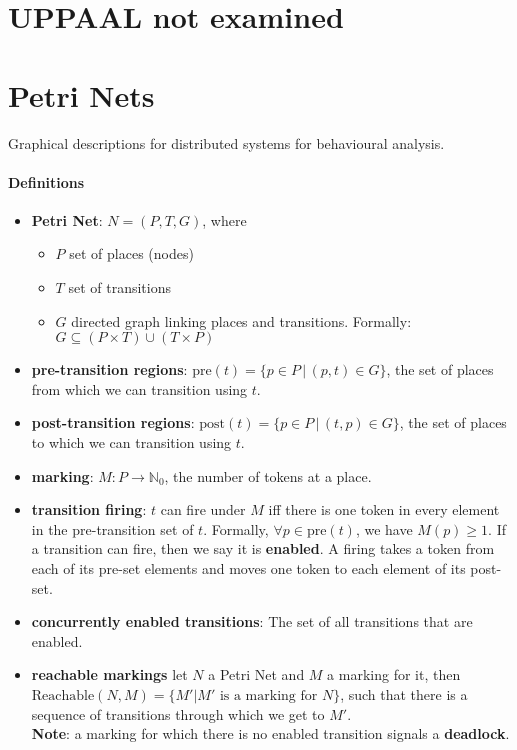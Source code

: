 \documentclass{article}
\begin{document}
\section{UPPAAL not examined}
\section{Petri Nets}
Graphical descriptions for distributed systems for behavioural analysis.
\paragraph{Definitions}
\begin{itemize}
\item \textbf{Petri Net}: $N = (P, T, G)$, where
  \begin{itemize}
  \item $P$ set of places (nodes)
  \item $T$ set of transitions 
  \item $G$ directed graph linking places and transitions. Formally: $G
    \subseteq (P \times T) \cup (T \times P)$
  \end{itemize}
\item \textbf{pre-transition regions}: $\text{pre}(t) = \{ p \in P \,|\, (p, t)
  \in G\}$, the set of places from which we can transition using $t$.
\item \textbf{post-transition regions}: $\text{post}(t) = \{ p \in P \,|\, (t, p)
  \in G\}$, the set of places to which we can transition using $t$.
\item \textbf{marking}: $M: P \rightarrow \mathbb{N}_0$, the number of tokens at
  a place.
\item \textbf{transition firing}: $t$ can fire under $M$ iff there is one token
  in every element in the pre-transition set of $t$. Formally, $\forall p \in
  \text{pre}(t)$, we have $M(p) \geq 1$. If a transition can fire, then we say
  it is \textbf{enabled}. A firing takes a token from each of its pre-set
  elements and moves one token to each element of its post-set.
\item \textbf{concurrently enabled transitions}: The set of all transitions that
  are enabled.
\item \textbf{reachable markings} let $N$ a Petri Net and $M$ a marking for it,
  then $\text{Reachable}(N, M) = \{M' | M' \,\,\text{is a marking for}\,\,N\}$,
  such that there is a sequence of transitions through which we get to $M'$.
  \\
  \textbf{Note}: a marking for which there is no enabled transition signals a \textbf{deadlock}.

\end{itemize}
\end{document}
